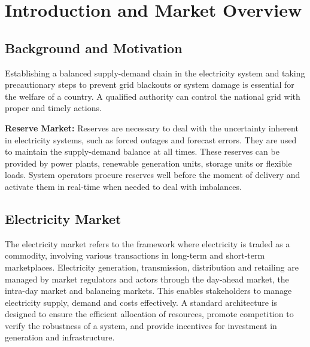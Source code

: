 \chapter{Introduction and Market Overview}

\section{Background and Motivation}
Establishing a balanced supply-demand chain in the electricity system and taking precautionary steps to prevent grid blackouts or system damage is essential for the welfare of a country. A qualified authority can control the national grid with proper and timely actions.

\noindent\textbf{Reserve Market:}
Reserves are necessary to deal with the uncertainty inherent in electricity systems, such as forced outages and forecast errors. They are used to maintain the supply-demand balance at all times. These reserves can be provided by power plants, renewable generation units, storage units or flexible loads. System operators procure reserves well before the moment of delivery and activate them in real-time when needed to deal with imbalances.


\section{Electricity Market}
The electricity market refers to the framework where electricity is traded as a commodity, involving various transactions in long-term and short-term marketplaces. Electricity generation, transmission, distribution and retailing are managed by market regulators and actors through the day-ahead market, the intra-day market and balancing markets. This enables stakeholders to manage electricity supply, demand and costs effectively. A standard architecture is designed to ensure the efficient allocation of resources, promote competition to verify the robustness of a system, and provide incentives for investment in generation and infrastructure.

